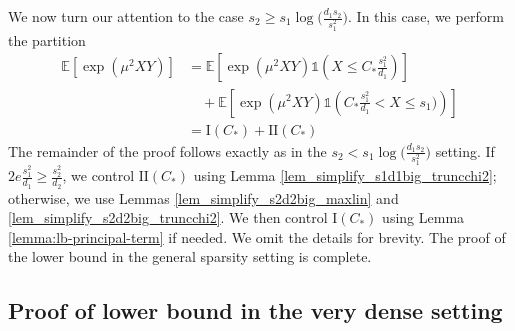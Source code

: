\documentclass{article}
\newcommand{\EE}{\mathbb{E}}
\newcommand{\one}{\mathds{1}}
\newcommand{\Ct}{C_{*}}
\theoremstyle{remark}
\begin{document}
We now turn our attention to the case $s_2 \geq s_1 \log \big(\frac{d_1s_2}{s_1^2}\big)$. In this case, we perform the partition
\begin{align*}
    \EE[\exp(\mu^2XY)] &= \EE[\exp(\mu^2XY)\one(X \leq \Ct \frac{s_1^2}{d_1})] \\
    &\quad +  \EE[\exp(\mu^2XY)\one(\Ct \frac{s_1^2}{d_1} < X \leq s_1\big))] \\
    &= \text{I}(C_*) + \text{II}(C_*)
\end{align*}
The remainder of the proof follows exactly as in the $s_2 < s_1 \log \big(\frac{d_1s_2}{s_1^2}\big)$ setting. If $2e\frac{s_1^2}{d_1} \geq \frac{s_2^2}{d_2}$, we control $\text{II}(C_*)$ using Lemma \ref{lem_simplify_s1d1big_truncchi2}; otherwise, we use Lemmas \ref{lem_simplify_s2d2big_maxlin} and \ref{lem_simplify_s2d2big_truncchi2}. We then control $\text{I}(C_*)$ using Lemma \ref{lemma:lb-principal-term} if needed. We omit the details for brevity. The proof of the lower bound in the general sparsity setting is complete.

\subsection{Proof of lower bound in the very dense setting}\label{sec_pf_lb_dense}
\end{document}
